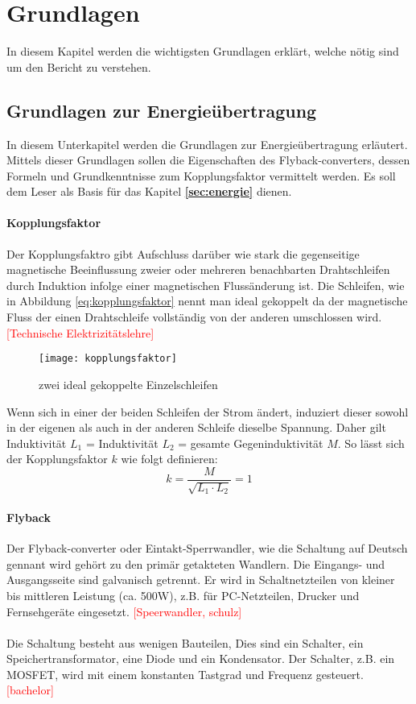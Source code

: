 \section{Grundlagen}
\label{sec:Grundlagen}
In diesem Kapitel werden die wichtigsten Grundlagen erklärt, welche nötig sind um den Bericht zu verstehen.

\subsection{Grundlagen zur Energieübertragung}
In diesem Unterkapitel werden die Grundlagen zur Energieübertragung erläutert. Mittels dieser Grundlagen sollen die Eigenschaften des Flyback-converters, dessen Formeln und Grundkenntnisse zum Kopplungsfaktor vermittelt werden.
Es soll dem Leser als Basis für das Kapitel \textbf{\ref{sec:energie} } dienen.


\paragraph{Kopplungsfaktor}
Der Kopplungsfaktro gibt Aufschluss darüber wie stark die gegenseitige magnetische Beeinflussung zweier oder mehreren benachbarten Drahtschleifen durch Induktion infolge einer magnetischen Flussänderung ist. Die Schleifen, wie in Abbildung \ref{eq:kopplungsfaktor} nennt man ideal gekoppelt da der magnetische Fluss der einen Drahtschleife vollständig von der anderen umschlossen wird. \textcolor{red}{[Technische Elektrizitätslehre]}

\begin{figure}[h]
	\centering
	\texttt{[image: kopplungsfaktor]}
	\caption{zwei ideal gekoppelte Einzelschleifen}\label{fig:kopplungsfaktor}
\end{figure}
Wenn sich in einer der beiden Schleifen der Strom ändert, induziert dieser sowohl in der eigenen als auch in der anderen Schleife dieselbe Spannung. Daher gilt Induktivität $ L_{1}$ = Induktivität $L_{2}$ = gesamte Gegeninduktivität $M$.
So lässt sich der Kopplungsfaktor $ k $ wie folgt definieren:
\begin{equation}
k=\frac{M}{\sqrt{L_{1}\cdot L_{2}}} = 1
\label{eq:kopplungsfaktor}
\end{equation}

\newpage

\paragraph{Flyback}
Der Flyback-converter oder Eintakt-Sperrwandler, wie die Schaltung auf Deutsch gennant wird gehört zu den primär getakteten Wandlern. Die Eingangs- und Ausgangsseite sind galvanisch getrennt. Er wird in Schaltnetzteilen von kleiner bis mittleren Leistung (ca. 500W), z.B. für PC-Netzteilen, Drucker und Fernsehgeräte eingesetzt. \textcolor{red}{[Speerwandler, schulz]}
\\\\
Die Schaltung besteht aus wenigen Bauteilen, Dies sind ein Schalter, ein Speichertransformator, eine Diode und ein Kondensator. Der Schalter, z.B. ein MOSFET, wird mit einem konstanten Tastgrad und Frequenz gesteuert. \textcolor{red}{[bachelor]}

